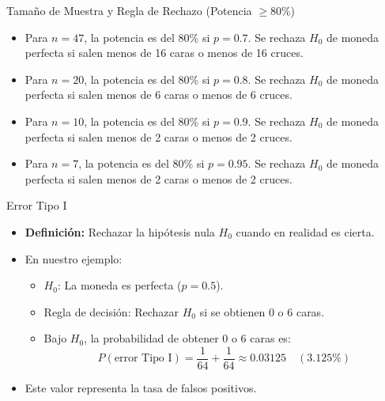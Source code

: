 ﻿\documentclass{beamer}
\begin{document}
\begin{frame}{Tamaño de Muestra y Regla de Rechazo (Potencia $\geq 80\%$)}
    \begin{itemize}
        \item Para \(n=47\), la potencia es del 80\% si \(p=0.7\). Se rechaza \(H_0\) de moneda perfecta si salen menos de 16 caras o menos de 16 cruces.
        \item Para \(n=20\), la potencia es del 80\% si \(p=0.8\). Se rechaza \(H_0\) de moneda perfecta si salen menos de 6 caras o menos de 6 cruces.
        \item Para \(n=10\), la potencia es del 80\% si \(p=0.9\). Se rechaza \(H_0\) de moneda perfecta si salen menos de 2 caras o menos de 2 cruces.
        \item Para \(n=7\), la potencia es del 80\% si \(p=0.95\). Se rechaza \(H_0\) de moneda perfecta si salen menos de 2 caras o menos de 2 cruces.
    \end{itemize}
\end{frame}



\begin{frame}{Error Tipo I}
    \begin{itemize}
        \item \textbf{Definición:} Rechazar la hipótesis nula \(H_0\) cuando en realidad es cierta.
        \item En nuestro ejemplo:
        \begin{itemize}
            \item \(H_0\): La moneda es perfecta (\(p=0.5\)).
            \item Regla de decisión: Rechazar \(H_0\) si se obtienen 0 o 6 caras.
            \item Bajo \(H_0\), la probabilidad de obtener 0 o 6 caras es:
            \[
            P(\text{error Tipo I}) = \frac{1}{64} + \frac{1}{64} \approx 0.03125 \quad (3.125\%)
            \]
        \end{itemize}
        \item Este valor representa la tasa de falsos positivos.
    \end{itemize}
\end{frame}
\end{document}
